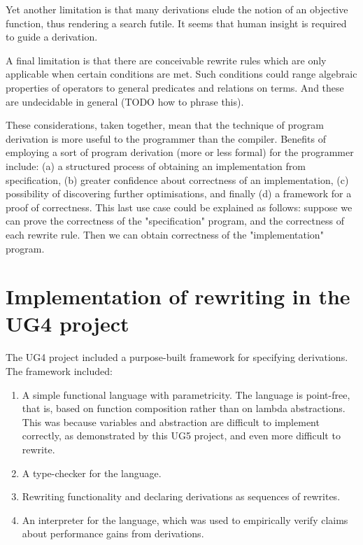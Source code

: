 \documentclass[bsc,frontabs,oneside,singlespacing,parskip,deptreport]{infthesis}
\theoremstyle{definition}
\begin{document}
Yet another limitation is that many derivations elude the notion of an
objective function, thus rendering a search futile. It seems that
human insight is required to guide a derivation.

A final limitation is that there are conceivable rewrite rules which
are only applicable when certain conditions are met. Such conditions
could range algebraic properties of operators to general predicates
and relations on terms. And these are undecidable in general (TODO how
to phrase this).

These considerations, taken together, mean that the technique of
program derivation is more useful to the programmer than the
compiler. Benefits of employing a sort of program derivation (more or
less formal) for the programmer include: (a) a structured process of
obtaining an implementation from specification, (b) greater confidence
about correctness of an implementation, (c) possibility of discovering
further optimisations, and finally (d) a framework for a proof of
correctness. This last use case could be explained as follows: suppose
we can prove the correctness of the "specification" program, and the
correctness of each rewrite rule. Then we can obtain correctness of
the "implementation" program.

\section{Implementation of rewriting in the UG4 project}
\label{sec:impl-rewr-ug4}

The UG4 project included a purpose-built framework for specifying
derivations. The framework included:

\begin{enumerate}
\item A simple functional language with parametricity. The language is
point-free, that is, based on function composition rather than on
lambda abstractions. This was because variables and abstraction are
difficult to implement correctly, as demonstrated by this UG5 project,
and even more difficult to rewrite.

\item A type-checker for the language.

\item Rewriting functionality and declaring derivations as sequences of
  rewrites.

\item An interpreter for the language, which was used to empirically
  verify claims about performance gains from derivations.
\end{enumerate}
\end{document}
